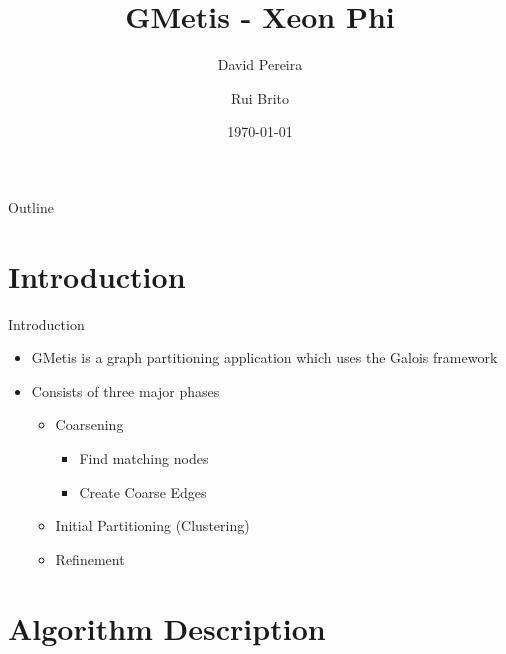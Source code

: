 \documentclass{beamer}
\title{
    GMetis - Xeon Phi
}
\author{
    David Pereira
    \and
    Rui Brito
}
\date{\today}
\begin{document}
\begin{frame}
  \titlepage
\end{frame}

\begin{frame}{Outline}
  \tableofcontents
\end{frame}



\section{Introduction}

\begin{frame}{Introduction}
\begin{itemize}
    \item GMetis is a graph partitioning application which uses the Galois
      framework
    \item Consists of three major phases
      \begin{itemize}
        \item Coarsening
        \begin{itemize}
          \item Find matching nodes
          \item Create Coarse Edges
        \end{itemize}
        \item Initial Partitioning (Clustering)
        \item Refinement
      \end{itemize}
\end{itemize}
\end{frame}



\section{Algorithm Description}
\end{document}
